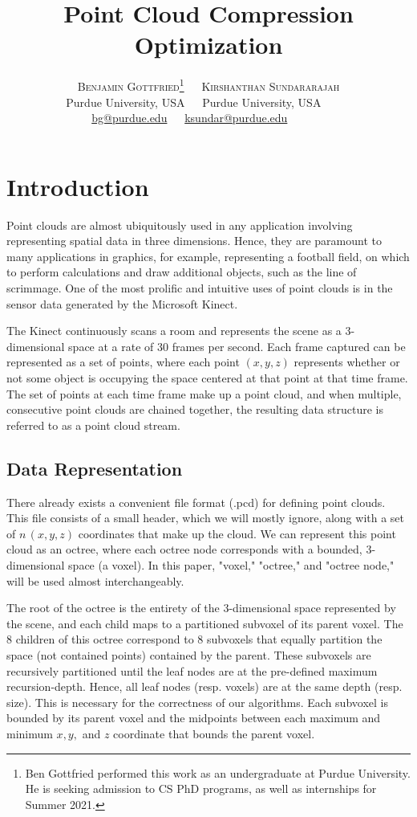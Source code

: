\documentclass[twoside,twocolumn]{article}
\title{Point Cloud Compression Optimization} %
\author{
\textline[t]{$\ $\textsc{Milind Kulkarni}}
{\textsc{Benjamin Gottfried}\thanks{Ben Gottfried performed this work as an undergraduate at Purdue
University. He is seeking admission to CS PhD programs, as well as internships for Summer 2021.}$\quad\ $}
{\textsc{Kirshanthan Sundararajah}}\\[0.5ex]
\textline[t]{\normalsize Purdue University, USA}
{\normalsize Purdue University, USA$\quad\ $}
{\normalsize Purdue University, USA$\qquad\ \ \  $}\\[-1ex]
\textline[t]{$\ \ \,$\normalsize \href{mailto:milind@purdue.edu}{milind@purdue.edu}}
{\normalsize \href{mailto:bg@purdue.edu}{bg@purdue.edu}$\quad\ $}
{\normalsize \href{mailto:ksundar@purdue.edu}{ksundar@purdue.edu}$\qquad\quad\ \,$}
}
\date{} %
\begin{document}
\maketitle %


\section{Introduction} \label{sec:Introduction}

Point clouds are almost ubiquitously used in any application involving representing spatial data in three
dimensions. Hence, they are paramount to many applications in graphics, for example, representing a football
field, on which to perform calculations and draw additional objects, such as the line of scrimmage.
One of the most prolific and intuitive uses of point clouds is in the sensor data generated by the
Microsoft Kinect.

The Kinect continuously scans a room and represents the scene as a 3-dimensional space at a rate of
30 frames per second. Each frame captured can be represented as a set of points, where each point $(x,y,z)$
represents whether or not some object is occupying the space centered at that point at that time frame.
The set of points at each time frame make up a point cloud, and when multiple, consecutive point clouds
are chained together, the resulting data structure is referred to as a point cloud stream.


\subsection{Data Representation} \label{sec:Data Representation}

There already exists a convenient file format (.pcd) for defining point clouds. This file consists
of a small header, which we will mostly ignore, along with a set of $n \, (x,y,z)$ coordinates
that make up the cloud. We can represent this point cloud as an octree, where each octree node corresponds
with a bounded, 3-dimensional space (a voxel). In this paper, "voxel," "octree," and "octree node," will be
used almost interchangeably.

The root of the octree is the entirety of the 3-dimensional space represented by the scene, and each
child maps to a partitioned subvoxel of its parent voxel. The 8 children of this octree correspond to 8
subvoxels that equally partition the space (not contained points) contained by the parent. These
subvoxels are recursively partitioned until the leaf nodes are at the pre-defined maximum recursion-depth.
Hence, all leaf nodes (resp. voxels) are at the same depth (resp. size). This is necessary for the
correctness of our algorithms. Each subvoxel is bounded by its parent voxel and the midpoints between
each maximum and minimum $x, y,$ and $z$ coordinate that bounds the parent voxel.
\end{document}
